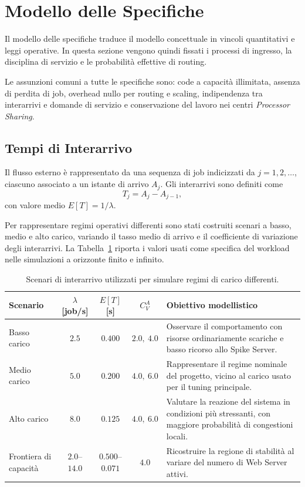 ﻿\documentclass[a4paper,12pt]{article}
\begin{document}
\section{Modello delle Specifiche}
Il modello delle specifiche traduce il modello concettuale in vincoli quantitativi e leggi operative. In questa sezione vengono quindi fissati i processi di ingresso, la disciplina di servizio e le probabilità effettive di routing.

Le assunzioni comuni a tutte le specifiche sono: code a capacità illimitata, assenza di perdita di job, overhead nullo per routing e scaling, indipendenza tra interarrivi e domande di servizio e conservazione del lavoro nei centri \textit{Processor Sharing}.

\subsection{Tempi di Interarrivo}
Il flusso esterno è rappresentato da una sequenza di job indicizzati da $j=1,2,\dots$, ciascuno associato a un istante di arrivo $A_j$. Gli interarrivi sono definiti come
\begin{equation}
    T_j = A_j - A_{j-1},
\end{equation}
con valore medio $E[T]=1/\lambda$.

Per rappresentare regimi operativi differenti sono stati costruiti scenari a basso, medio e alto carico, variando il tasso medio di arrivo e il coefficiente di variazione degli interarrivi. La Tabella~\ref{tab:interarrival_scenarios} riporta i valori usati come specifica del workload nelle simulazioni a orizzonte finito e infinito.

\begin{table}[H]
    \centering
    \small
    \renewcommand{\arraystretch}{1.22}
    \begin{tabular}{lcccp{5.6cm}}
        \hline
        \textbf{Scenario} & \textbf{$\lambda$ [job/s]} & \textbf{$E[T]$ [s]} & \textbf{$C_V^A$} & \textbf{Obiettivo modellistico} \\ \hline
        Basso carico & $2.5$ & $0.400$ & $2.0,\ 4.0$ & Osservare il comportamento con risorse ordinariamente scariche e basso ricorso allo Spike Server. \\
        Medio carico & $5.0$ & $0.200$ & $4.0,\ 6.0$ & Rappresentare il regime nominale del progetto, vicino al carico usato per il tuning principale. \\
        Alto carico & $8.0$ & $0.125$ & $4.0,\ 6.0$ & Valutare la reazione del sistema in condizioni più stressanti, con maggiore probabilità di congestioni locali. \\
        Frontiera di capacità & $2.0$--$14.0$ & $0.500$--$0.071$ & $4.0$ & Ricostruire la regione di stabilità al variare del numero di Web Server attivi. \\ \hline
    \end{tabular}
    \caption{Scenari di interarrivo utilizzati per simulare regimi di carico differenti.}
    \label{tab:interarrival_scenarios}
\end{table}
\end{document}
